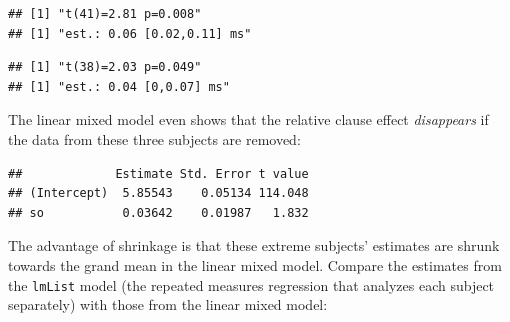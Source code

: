 \documentclass[
  12pt,
]{krantz}
\newenvironment{Shaded}{\begin{snugshade}}{\end{snugshade}}
\newcommand{\DecValTok}[1]{\textcolor[rgb]{0.00,0.00,0.81}{#1}}
\newcommand{\DocumentationTok}[1]{\textcolor[rgb]{0.56,0.35,0.01}{\textbf{\textit{#1}}}}
\newcommand{\FunctionTok}[1]{\textcolor[rgb]{0.00,0.00,0.00}{#1}}
\newcommand{\NormalTok}[1]{#1}
\newcommand{\OtherTok}[1]{\textcolor[rgb]{0.56,0.35,0.01}{#1}}
\newcommand{\SpecialCharTok}[1]{\textcolor[rgb]{0.00,0.00,0.00}{#1}}
\theoremstyle{definition}
\theoremstyle{definition}
\theoremstyle{definition}
\theoremstyle{definition}
\theoremstyle{remark}
\begin{document}
\begin{verbatim}
## [1] "t(41)=2.81 p=0.008"
## [1] "est.: 0.06 [0.02,0.11] ms"
\end{verbatim}

\begin{Shaded}
\end{Shaded}

\begin{verbatim}
## [1] "t(38)=2.03 p=0.049"
## [1] "est.: 0.04 [0,0.07] ms"
\end{verbatim}

The linear mixed model even shows that the relative clause effect \emph{disappears} if the data from these three subjects are removed:

\begin{Shaded}
\end{Shaded}

\begin{verbatim}
##             Estimate Std. Error t value
## (Intercept)  5.85543    0.05134 114.048
## so           0.03642    0.01987   1.832
\end{verbatim}

The advantage of shrinkage is that these extreme subjects' estimates are shrunk towards the grand mean in the linear mixed model. Compare the estimates from the \texttt{lmList} model (the repeated measures regression that analyzes each subject separately) with those from the linear mixed model:
\end{document}
